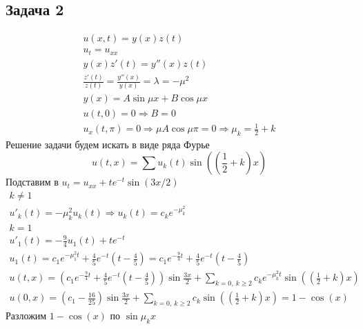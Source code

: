 \subsection*{Задача 2}
	\begin{gather*}
		u(x,t) = y(x)z(t)\\
		u_{t} = u_{xx}\\
		y(x) z'(t) = y''(x) z(t)\\
		\frac{z'(t)}{z(t)} = \frac{y''(x)}{y(x)} = \lambda = -\mu^2\\
		y(x) = A \sin \mu x + B \cos \mu x\\
		u(t,0) = 0 \Rightarrow B = 0\\
		u_{x}(t,\pi) = 0 \Rightarrow \mu A \cos \mu \pi = 0 \Rightarrow \mu_{k} = \frac{1}{2} + k
	\end{gather*}
	Решение задачи будем искать в виде ряда Фурье
	\begin{equation*}
		u(t,x) = \sum u_{k}(t)\sin\left(\left(\frac{1}{2} + k\right)x\right)
	\end{equation*}
	Подставим в $u_{t} = u_{xx} + t e^{-t} \sin(3x/2)$
	\begin{gather*}
		k \ne 1\\
		u'_{k}(t) = -\mu_{k}^{2} u_{k}(t) \Rightarrow u_{k}(t) = c_{k} e^{-\mu^{2}_{k}}\\
		k = 1\\
		u'_{1}(t) = -\frac{9}{4} u_{1}(t) + te^{-t}\\
		u_{1}(t) = c_{1} e^{-\mu_{1}^{2} t} + \frac{4}{5} e^{-t} \left(t - \frac{4}{5}\right)
		= c_{1} e^{-\frac{9}{4}t} + \frac{4}{5} e^{-t}\left(t - \frac{4}{5}\right)\\
		u(t,x) = \left(c_{1} e^{-\frac{9}{4}t} + \frac{4}{5} e^{-t} \left(t - \frac{4}{5}\right)\right) \sin \frac{3x}{2} + \sum\limits_{k = 0,\ k \geqslant 2} c_{k} e^{-\mu_{k}^{2}t} \sin \left(\left(\frac{1}{2}+k\right)x\right)\\
		u(0,x) = (c_{1} - \frac{16}{25}) \sin \frac{3x}{2} + \sum\limits_{k = 0,\ k \geqslant 2} c_{k} \sin \left(\left(\frac{1}{2}+k\right)x\right) = 1 - \cos(x)
	\end{gather*}
	Разложим $1-\cos(x)$ по $\sin \mu_{k} x$
